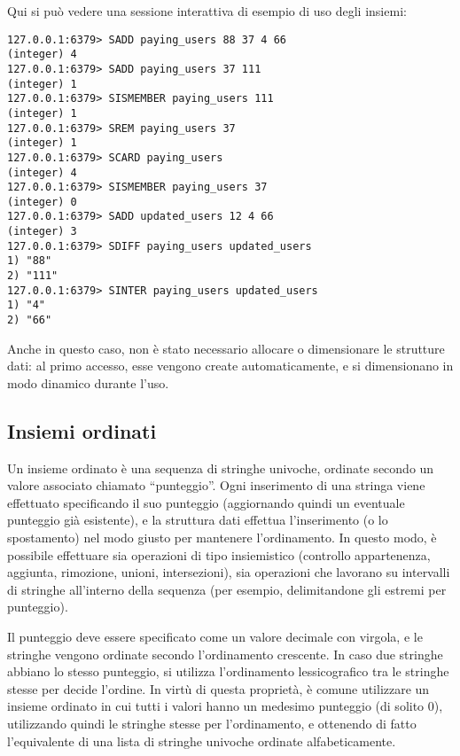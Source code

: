 Qui si può vedere una sessione interattiva di esempio di uso degli insiemi:

\medskip
\begin{lstlisting}
127.0.0.1:6379> SADD paying_users 88 37 4 66
(integer) 4
127.0.0.1:6379> SADD paying_users 37 111
(integer) 1
127.0.0.1:6379> SISMEMBER paying_users 111
(integer) 1
127.0.0.1:6379> SREM paying_users 37
(integer) 1
127.0.0.1:6379> SCARD paying_users
(integer) 4
127.0.0.1:6379> SISMEMBER paying_users 37
(integer) 0
127.0.0.1:6379> SADD updated_users 12 4 66
(integer) 3
127.0.0.1:6379> SDIFF paying_users updated_users
1) "88"
2) "111"
127.0.0.1:6379> SINTER paying_users updated_users
1) "4"
2) "66"
\end{lstlisting}

Anche in questo caso, non è stato necessario allocare o dimensionare le strutture dati: al primo
accesso, esse vengono create automaticamente, e si dimensionano in modo dinamico durante l'uso.

\subsection{Insiemi ordinati}

Un insieme ordinato è una sequenza di stringhe univoche, ordinate secondo un valore associato
chiamato ``punteggio''. Ogni inserimento di una stringa viene effettuato specificando il suo
punteggio (aggiornando quindi un eventuale punteggio già esistente), e la struttura dati effettua
l'inserimento (o lo spostamento) nel modo giusto per mantenere l'ordinamento. In questo modo, è
possibile effettuare sia operazioni di tipo insiemistico (controllo appartenenza, aggiunta,
rimozione, unioni, intersezioni), sia operazioni che lavorano su intervalli di stringhe all'interno
della sequenza (per esempio, delimitandone gli estremi per punteggio).

Il punteggio deve essere specificato come un valore decimale con virgola, e le stringhe vengono
ordinate secondo l'ordinamento crescente. In caso due stringhe abbiano lo stesso punteggio, si
utilizza l'ordinamento lessicografico tra le stringhe stesse per decide l'ordine. In virtù di
questa proprietà, è comune utilizzare un insieme ordinato in cui tutti i valori hanno un medesimo
punteggio (di solito 0), utilizzando quindi le stringhe stesse per l'ordinamento, e ottenendo di
fatto l'equivalente di una lista di stringhe univoche ordinate alfabeticamente.

